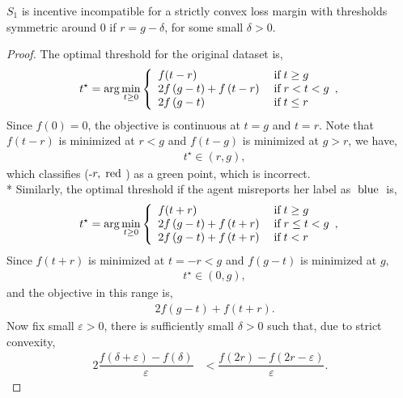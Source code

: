 \documentclass{article}
\begin{document}
\begin{lem} \label{lem:ex1g} 
$S_{1}$ is incentive incompatible for a strictly convex loss margin with thresholds symmetric around $0$ if $r  = g  - \delta$, for some small $\delta > 0$.
\end{lem}
\begin{proof} \label{proof:ex1gpf} 
The optimal threshold for the original dataset is,
\[ t^\star  = \arg\displaystyle\min_{t \geq  0}\left\{ \begin{array}{ll}
f(t - r)& \text{\;if\;} t \geq  g \\
2 f\left(g - t\right) + f\left(t - r\right)& \text{\;if\;} r < t < g \\
2 f\left(g - t\right)& \text{\;if\;} t \leq  r \\
\end{array},\right. \]
Since $f\left(0\right)  = 0$, the objective is continuous at $t  = g $ and $t  = r $. Note that $f\left(t - r\right) $ is minimized at $r  < g$ and $f\left(t - g\right) $ is minimized at $g  > r$, we have,
\begin{align*}
&t^\star  \in \left(r , g \right),
\end{align*}
which classifies (-$r , \text{\;red\;}$) as a green point, which is incorrect.
\\* Similarly, the optimal threshold if the agent misreports her label as $\text{\;blue\;}$ is,
\[ t^\star  = \arg\displaystyle\min_{t \geq  0}\left\{ \begin{array}{ll}
f(t + r)& \text{\;if\;} t \geq  g \\
2 f\left(g - t\right) + f\left(t + r\right)& \text{\;if\;} r \leq  t < g \\
2 f\left(g - t\right) + f\left(t + r\right)& \text{\;if\;} t < r \\
\end{array},\right. \]
Since $f\left(t + r\right) $ is minimized at $t  = -r < g $ and $f\left(g - t\right) $ is minimized at $g, $
\begin{align*}
&t^\star  \in \left(0, g \right),
\end{align*}
and the objective in this range is,
\begin{align*}
&2 f\left(g - t\right) + f\left(t + r\right).
\end{align*}
Now fix small $\varepsilon > 0$, there is sufficiently small $\delta > 0$ such that, due to strict convexity,
\begin{align*}
2 \dfrac{f\left(\delta + \varepsilon\right) - f\left(\delta\right)}{\varepsilon} &< \dfrac{f\left(2 r\right) - f\left(2 r - \varepsilon\right)}{\varepsilon} .

\end{align*}
\end{proof}
\end{document}
